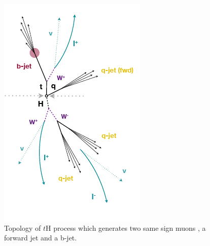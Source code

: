 	\begin{figure}[!htbp]
		\centering
		\includegraphics[scale=0.9]{Chapter1/jet.png}
		\caption{Topology of $t$H process which generates two same sign muons , a forward jet and a b-jet.} 
		\label{jet}
	\end{figure}

\pagebreak


